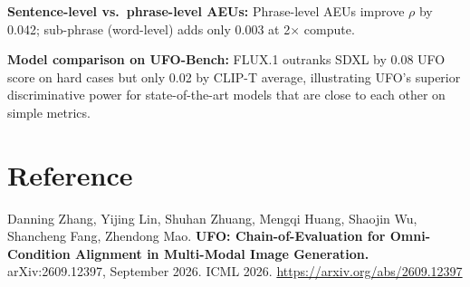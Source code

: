 \documentclass[10pt,twocolumn]{article}
\begin{document}
\textbf{Sentence-level vs.\ phrase-level AEUs:} Phrase-level AEUs
improve $\rho$ by 0.042; sub-phrase (word-level) adds only 0.003
at 2$\times$ compute.

\textbf{Model comparison on UFO-Bench:} FLUX.1 outranks SDXL by
0.08 UFO score on hard cases but only 0.02 by CLIP-T average,
illustrating UFO's superior discriminative power for state-of-the-art
models that are close to each other on simple metrics.

\section*{Reference}

Danning Zhang, Yijing Lin, Shuhan Zhuang, Mengqi Huang, Shaojin Wu,
Shancheng Fang, Zhendong Mao.
\textbf{UFO: Chain-of-Evaluation for Omni-Condition Alignment in
Multi-Modal Image Generation.}
arXiv:2609.12397, September 2026. ICML 2026.
\url{https://arxiv.org/abs/2609.12397}
\end{document}
